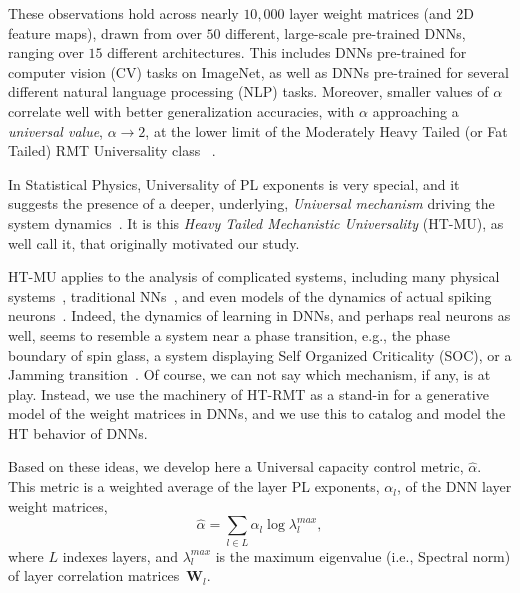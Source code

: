 These observations hold across nearly $10,000$ layer weight matrices (and 2D feature maps), drawn from over $50$ different, large-scale pre-trained DNNs, ranging over $15$ different architectures.
This includes DNNs pre-trained for computer vision (CV) tasks on ImageNet, as well as DNNs pre-trained for several different natural language processing (NLP) tasks.
Moreover, smaller values of $\alpha$ correlate well with better generalization accuracies, with $\alpha$ approaching a \emph{universal value}, $\alpha\rightarrow 2$, at the lower limit of the Moderately Heavy Tailed (or Fat Tailed) RMT Universality class~\cite{MM18_TR,MM19_HTSR_ICML} .  

In Statistical Physics, Universality of PL exponents is very special, and it suggests the presence of a deeper, underlying, \emph{Universal mechanism} driving the system dynamics~\cite{SornetteBook,BouchaudPotters03}.
It is this \emph{Heavy Tailed Mechanistic Universality} (HT-MU), as well call it, that originally motivated our study.  

HT-MU applies to the analysis of complicated systems, including many physical systems~\cite{SornetteBook}, traditional NNs~\cite{EB01_BOOK,nishimori01}, and even models of the dynamics of actual spiking neurons~\cite{XXX-SOME-NEURAL-SPIKE-PAPER}.
 
Indeed, the dynamics of learning in DNNs, and perhaps real neurons as well, seems to resemble a system near a phase transition, e.g., the phase boundary of spin glass, a system displaying Self Organized Criticality (SOC), or a Jamming transition~\cite{GSdx18_TR,SGd18_TR}. 
Of course, we can not say which mechanism, if any, is at play. 
Instead, we use the machinery of  HT-RMT as a stand-in for a generative model of the weight matrices in DNNs, and we use this to catalog and model the HT behavior of DNNs.%

Based on these ideas, we develop here a Universal capacity control metric, $\hat{\alpha}$.
This metric is a weighted average of the layer PL exponents, $\alpha_{l}$, of the DNN layer weight matrices,
\begin{equation}
\hat{\alpha}=\sum_{l\in L}\alpha_{l}\log\lambda_{l}^{max}  ,
\label{eqn:alpha_hat_specific}
\end{equation}
where $L$ indexes layers, and 
$\lambda_{l}^{max}$ is the maximum eigenvalue (i.e., Spectral norm) of layer correlation matrices~$\mathbf{W}_{l}$. 

